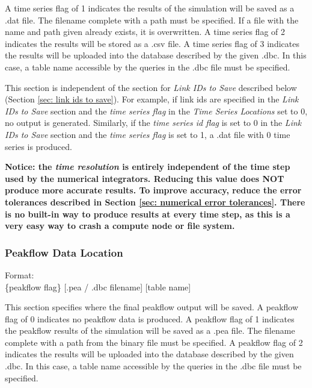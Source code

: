 \documentclass[12pt]{article}
\newenvironment{codeindent}
{\begin{list}{}
        {\setlength{\leftmargin}{.1in}}
        \item[]
}
{\end{list}}
\begin{document}
A time series flag of 1 indicates the results of the simulation will be saved as a .dat file. The filename complete with a path must be specified. If a file with the name and path given already exists, it is overwritten. A time series flag of 2 indicates the results will be stored as a .csv file. A time series flag of 3 indicates the results will be uploaded into the database described by the given .dbc. In this case, a table name accessible by the queries in the .dbc file must be specified.

This section is independent of the section for \textit{Link IDs to Save} described below (Section \ref{sec: link ids to save}). For example, if link ids are specified in the \textit{Link IDs to Save} section and the \textit{time series flag} in the \textit{Time Series Locations} set to 0, no output is generated. Similarly, if the \textit{time series id flag} is set to 0 in the \textit{Link IDs to Save} section and the \textit{time series flag} is set to 1, a .dat file with 0 time series is produced.

\textbf{Notice: the \emph{time resolution} is entirely independent of the time step used by the numerical integrators. Reducing this value does NOT produce more accurate results. To improve accuracy, reduce the error tolerances described in Section \ref{sec: numerical error tolerances}. There is no built-in way to produce results at every time step, as this is a very easy way to crash a compute node or file system.}

\subsubsection{Peakflow Data Location} \label{sec: peakflow data location}

\begin{codeindent}
 Format: \\
 \{peakflow flag\} [.pea / .dbc filename] [table name]
\end{codeindent}

This section specifies where the final peakflow output will be saved. A peakflow flag of 0 indicates no peakflow data is produced. A peakflow flag of 1 indicates the peakflow results of the simulation will be saved as a .pea file. The filename complete with a path from the binary file must be specified. A peakflow flag of 2 indicates the results will be uploaded into the database described by the given .dbc. In this case, a table name accessible by the queries in the .dbc file must be specified.
\end{document}
